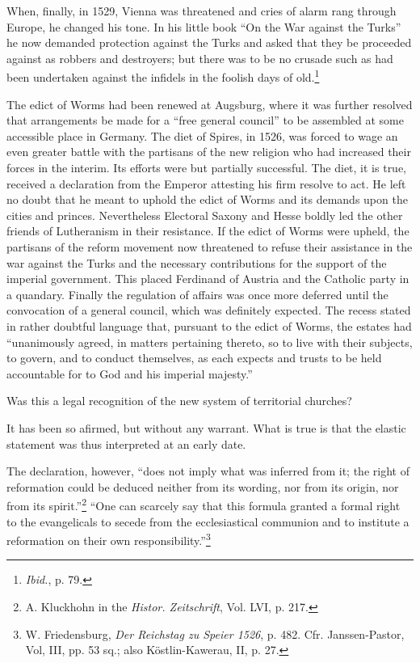 When, finally, in 1529, Vienna was threatened and cries of alarm
rang through Europe, he changed his tone. In his little book “On the
War against the Turks” he now demanded protection against the
Turks and asked that they be proceeded against as robbers and destroyers;
but there was to be no crusade such as had been undertaken
against the infidels in the foolish days of old.\footnote{\textit{Ibid.}, p. 79.}


The edict of Worms had been renewed at Augsburg, where it was
further resolved that arrangements be made for a “free general council”
to be assembled at some accessible place in Germany. The diet
of Spires, in 1526, was forced to wage an even greater battle with
the partisans of the new religion who had increased their forces in
the interim. Its efforts were but partially successful. The diet, it is
true, received a declaration from the Emperor attesting his firm
resolve to act. He left no doubt that he meant to uphold the edict
of Worms and its demands upon the cities and princes. Nevertheless
Electoral Saxony and Hesse boldly led the other friends of Lutheranism
in their resistance. If the edict of Worms were upheld, the
partisans of the reform movement now threatened to refuse their
assistance in the war against the Turks and the necessary contributions
for the support of the imperial government. This placed
Ferdinand of Austria and the Catholic party in a quandary. Finally
the regulation of affairs was once more deferred until the convocation
of a general council, which was definitely expected. The recess
stated in rather doubtful language that, pursuant to the edict of
Worms, the estates had “unanimously agreed, in matters pertaining
thereto, so to live with their subjects, to govern, and to conduct
themselves, as each expects and trusts to be held accountable for to
God and his imperial majesty.”

Was this a legal recognition of the new system of territorial
churches?

It has been so afirmed, but without any warrant. What is true is
that the elastic statement was thus interpreted at an early date.

The declaration, however, “does not imply what was inferred from it; the
right of reformation could be deduced neither from its wording, nor from
its origin, nor from its spirit.”\footnote{A. Kluckhohn in the \textit{Histor. Zeitschrift}, Vol. LVI, p. 217.}
 “One can scarcely say that this formula
granted a formal right to the evangelicals to secede from the ecclesiastical
communion and to institute a reformation on their own responsibility.”\footnote{W. Friedensburg, \textit{Der Reichstag zu Speier 1526}, p. 482. Cfr. Janssen-Pastor, Vol, III,
pp. 53 sq.; also Köstlin-Kawerau, II, p. 27.}

